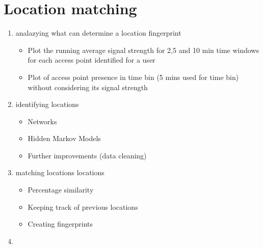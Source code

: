 \section{Location matching}

\begin{enumerate}
  \item analazying what can determine a location fingerprint
	\begin{itemize}
		\item Plot the running average signal strength for 2,5 and 10 min time windows
		for each access point identified for a user
		\item Plot of access point presence in time bin (5 mins used for time bin)
		without considering its signal strength
	\end{itemize}
  \item identifying locations
	\begin{itemize}
		\item Networks 
		\item Hidden Markov Models 
		\item Further improvements (data cleaning)
	\end{itemize}
  \item matching locations locations
	\begin{itemize}
		\item Percentage similarity 
		\item Keeping track of previous locations 
		\item Creating fingerprints
	\end{itemize}
  \item  
\end{enumerate}